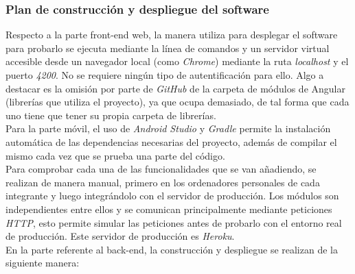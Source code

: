 \documentclass{article}
\begin{document}
\newpage
\subsubsection{Plan de construcción y despliegue del software}
Respecto a la parte front-end web, la manera utiliza para desplegar el software para probarlo se ejecuta mediante la línea de comandos y un servidor virtual accesible desde un navegador local (como \textit{Chrome}) mediante la ruta \textit{localhost} y el puerto \textit{4200}. No se requiere ningún tipo de autentificación para ello.
Algo a destacar es la omisión por parte de \textit{GitHub} de la carpeta de módulos de Angular (librerías que utiliza el proyecto), ya que ocupa demasiado, de tal forma que cada uno tiene que tener su propia carpeta de librerías.\\
\hfill \break
Para la parte móvil, el uso de \textit{Android Studio} y \textit{Gradle} permite la instalación automática de las dependencias necesarias del proyecto, además de compilar el mismo cada vez que se prueba una parte del código.\\
\hfill \break
Para comprobar cada una de las funcionalidades que se van añadiendo, se realizan de manera manual, primero en los ordenadores personales de cada integrante y luego integrándolo con el servidor de producción. 
Los módulos son independientes entre ellos y se comunican principalmente mediante peticiones \textit{HTTP}, esto permite simular las peticiones antes de probarlo con el entorno real de producción. 
Este servidor de producción es \textit{Heroku}. \\
\hfill \break
En la parte referente al back-end, la construcción y despliegue se realizan de la siguiente manera:
\end{document}
